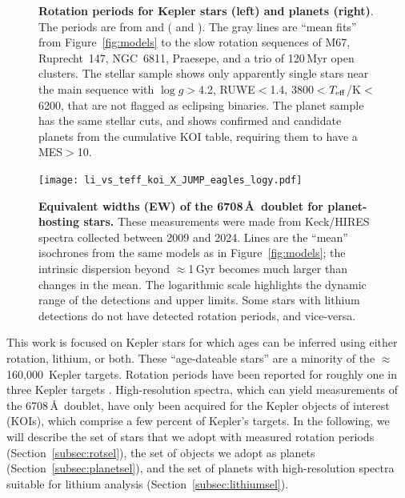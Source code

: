 \documentclass[11pt,twocolumn,tighten]{aastex63}
\newcommand{\nkeplerstars}{$\approx$160{,}000}
\begin{document}
\begin{figure}[!t]
	\begin{center}
	\end{center}
	\vspace{-0.5cm}
	\caption{
		{\bf Rotation periods for Kepler stars (left) and planets
			(right)}.  The periods are from \citet{Santos_2019} and
		\citet{Santos_2021} ( and
		).  The gray lines are ``mean fits'' from
		Figure~\ref{fig:models} to the slow rotation sequences of M67,
		Ruprecht~147, NGC~6811, Praesepe, and a trio of 120\,Myr open
		clusters.  The stellar sample shows only apparently single stars
		near the main sequence with $\log g$$>$4.2, RUWE$<$1.4,
		3800$<$$T_{\rm eff}$/K$<$6200, that are not flagged as eclipsing
		binaries.  The planet sample has the same stellar cuts, and shows
		confirmed and candidate planets from the cumulative KOI table,
		requiring them to have a MES$>$10.
	}
	\label{fig:prot_vs_teff}
\end{figure}

\begin{figure}[!t]
	\begin{center}
		\leavevmode
		\texttt{[image: li\_vs\_teff\_koi\_X\_JUMP\_eagles\_logy.pdf]}
	\end{center}
	\vspace{-0.6cm}
	\caption{
		{\bf Equivalent widths (EW) of the  6708\,\AA\ doublet
			for planet-hosting stars.} These measurements were made from
		Keck/HIRES spectra collected between 2009 and 2024.  Lines are the
		``mean'' isochrones from the same models as in
		Figure~\ref{fig:models}; the intrinsic dispersion beyond
		$\approx$1\,Gyr becomes much larger than changes in the mean.  The
		logarithmic scale highlights the dynamic range of the detections
		and upper limits.  Some stars with lithium detections do not have
		detected rotation periods, and vice-versa.
		\label{fig:li_vs_teff}
	}
\end{figure}



This work is focused on Kepler stars for which ages can be inferred
using either rotation, lithium, or both.  These ``age-dateable
stars'' are a minority of the \nkeplerstars\ Kepler targets.  Rotation
periods have been reported for roughly one in three Kepler targets
\citep[e.g.][]{McQuillan_2014,Santos_2021}.  High-resolution spectra,
which can yield measurements of the  6708\,\AA\ doublet, 
have only been acquired for the Kepler objects of interest
(KOIs), which comprise a few percent of Kepler's targets.
In the following, we will describe the set of stars that we
adopt with measured rotation periods (Section~\ref{subsec:rotsel}),
the set of objects we adopt as planets
(Section~\ref{subsec:planetsel}), and the set of planets with
high-resolution spectra suitable for lithium analysis
(Section~\ref{subsec:lithiumsel}).
\end{document}
